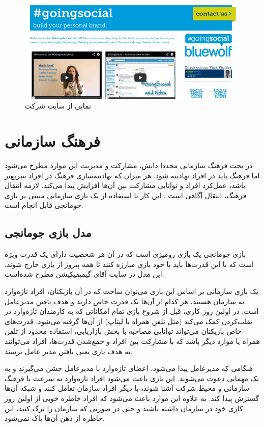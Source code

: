 \begin{figure}[!htb]
	\centering
	\includegraphics[width=\textwidth]{Figures/goingsocial.jpg}
	\caption{نمایی از سایت شرکت  \cite{goingsocial}}
\end{figure}

\section{فرهنگ سازمانی}
در بحث فرهنگ سازمانی مجددا دانش، مشارکت و مدیریت این موارد مطرح می‌شود اما فرهنگ باید در افراد نهادینه شود. هر میزان که نهادینه‌سازی فرهنگ در افراد سریع‌تر باشد، عمل‌کرد افراد و توانایی مشارکت بین آن‌ها افزایش پیدا می‌کند. لازمه انتقال فرهنگ، انتقال آگاهی است \cite{amiriamin}. این کار با استفاده از یک بازی سازمانی مبتنی بر بازی جومانجی قابل انجام است.
\subsection{مدل بازی جومانجی}
بازی جومانجی یک بازی رومیزی است که در آن هر شخصیت دارای یک قدرت ویژه است  که با این قدرت‌ها باید با خود بازی مبارزه کنند تا همه پیروز از بازی خارج شوند. این مدل در سایت آقای گیمیفیکیشن \cite{jumanji} مطرح شده‌است.

یک بازی سازمانی بر اساس این بازی می‌توان ساخت که در آن بازیکنان، افراد تازه‌وارد به سازمان هستند، هر کدام از آن‌ها یک قدرت خاص دارند و هدف یافتن مدبرعامل است. در اولین روز کاری، قبل از شروع بازی تمام امکاناتی که به کارمندان تازه‌وارد در تقلب‌کردن کمک می‌کند (مثل تلفن همراه یا لپتاپ) از آن‌ها گرفته می‌شود. قدرت‌های خاص بازیکنان می‌تواند توانایی مصاحبه با بخش بازاریابی، استفاده محدود از تلفن همراه یا موارد دیگر باشد که با مشارکت بین افراد و جمع‌شدن قدرت‌ها، افراد می‌توانند به هدف بازی یعنی یافتن مدیر عامل برسند.

هنگامی که مدیرعامل پیدا می‌شود، اعضای تازه‌وارد با مدیرعامل جشن می‌گیرند و به یک مهمانی دعوت می‌شوند. 
این بازی باعث می‌شود افراد تازه‌وارد به سرعت با فرهنگ سازمانی و محیط شرکت آشنا شوند، با دیگر افراد سازمان تعامل کنند و شبکه آن‌ها گسترش پیدا کند. به علاوه این موارد باعث می‌شود که افراد خاطره خوبی از اولین روز کاری خود در سازمان داشته باشند و حتی در صورتی که سازمان را ترک کنند، این خاطره از ذهن آن‌ها پاک نمی‌شود.
